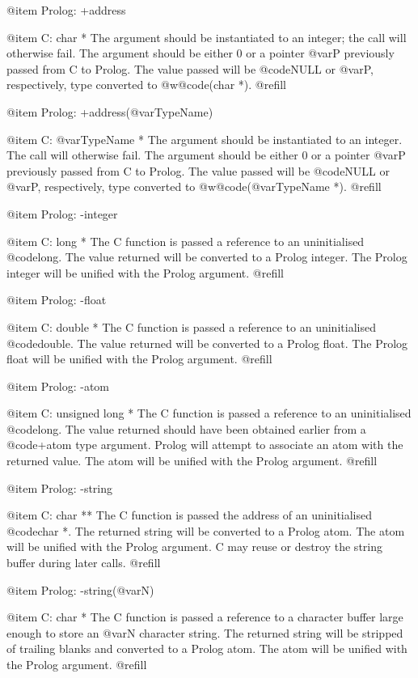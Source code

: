 @item Prolog: +address

@item C:      char *
The argument should be instantiated to an integer; the call will
otherwise fail.  The argument should be either 0 or a pointer @var{P}
previously passed from C to Prolog.  The value passed will be
@code{NULL} or @var{P}, respectively, type converted to 
@w{@code{(char *)}}. @refill

@item Prolog: +address(@var{TypeName})

@item C:      @var{TypeName} *
The argument should be instantiated to an integer.  The call will
otherwise fail.  The argument should be either 0 or a pointer @var{P}
previously passed from C to Prolog.  The value passed will be
@code{NULL} or @var{P}, respectively, type converted to
@w{@code{(@var{TypeName} *)}}. @refill

@item Prolog: -integer

@item C:      long *
The C function is passed a reference to an uninitialised @code{long}.
The value returned will be converted to a Prolog integer.  The Prolog
integer will be unified with the Prolog argument. @refill

@item Prolog: -float

@item C:      double *
The C function is passed a reference to an uninitialised @code{double}.  The
value returned will be converted to a Prolog float.  The Prolog float
will be unified with the Prolog argument. @refill

@item Prolog: -atom

@item C:      unsigned long *
The C function is passed a reference to an uninitialised @code{long}.
The value returned should have been obtained earlier from a @code{+atom}
type argument.  Prolog will attempt to associate an atom with the
returned value.  The atom will be unified with the Prolog argument.
@refill

@item Prolog: -string

@item C:      char **
The C function is passed the address of an uninitialised @code{char *}.
The returned string will be converted to a Prolog atom.  The atom will
be unified with the Prolog argument.  C may reuse or destroy the string
buffer during later calls. @refill

@item Prolog: -string(@var{N})

@item C:      char *
The C function is passed a reference to a character buffer large enough
to store an @var{N} character string.  The returned string will be
stripped of trailing blanks and converted to a Prolog atom.  The atom
will be unified with the Prolog argument. @refill

